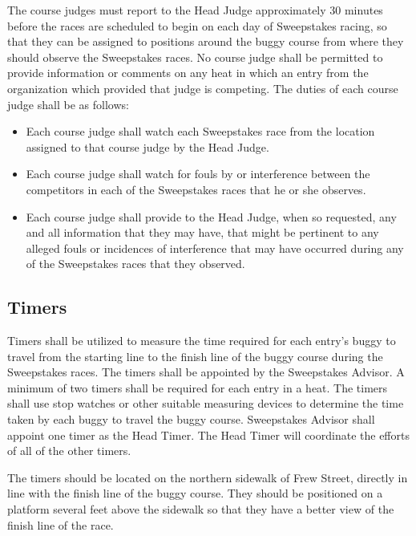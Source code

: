 	The course judges must report to the Head Judge approximately 30 minutes before
	the races are scheduled to begin on each day of Sweepstakes racing, so that
	they can be assigned to positions around the buggy course from where they
	should observe the Sweepstakes races. No course judge shall be permitted to
	provide information or comments on any heat in which an entry from the
	organization which provided that judge is competing. The duties of each course
	judge shall be as follows:

	\begin{itemize}

		\item Each course judge shall watch each Sweepstakes race from the location
		assigned to that course judge by the Head Judge.

		\item Each course judge shall watch for fouls by or interference between
		the competitors in each of the Sweepstakes races that he or she observes.

		\item Each course judge shall provide to the Head Judge, when so requested,
		any and all information that they may have, that might be pertinent to any
		alleged fouls or incidences of interference that may have occurred during any
		of the Sweepstakes races that they observed.

	\end{itemize}

\subsection{Timers}

	Timers shall be utilized to measure the time required for each entry's buggy to
	travel from the starting line to the finish line of the buggy course during the
	Sweepstakes races. The timers shall be appointed by the Sweepstakes Advisor. A
	minimum of two timers shall be required for each entry in a heat. The timers
	shall use stop watches or other suitable measuring devices to determine the
	time taken by each buggy to travel the buggy course. Sweepstakes Advisor shall
	appoint one timer as the Head Timer. The Head Timer will coordinate the efforts
	of all of the other timers.

	The timers should be located on the northern sidewalk of Frew Street, directly
	in line with the finish line of the buggy course. They should be positioned on
	a platform several feet above the sidewalk so that they have a better view of
	the finish line of the race.

